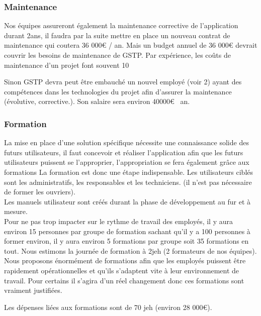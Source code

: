 \begin{enumerate}
    \subsubsection{Maintenance}

    Nos équipes assureront également la maintenance corrective de l'application durant 2ans, il faudra par la suite mettre en place un nouveau contrat de maintenance qui coutera 36 000€ / an. Mais un budget annuel de 36 000€ devrait couvrir les besoins de maintenance de GSTP. Par expérience, les coûts de maintenance d'un projet font souvent 10%

    Sinon GSTP devra peut être embauché un nouvel employé (voir 2) ayant des compétences dans les technologies du projet afin d'assurer la maintenance (évolutive, corrective.). Son salaire sera environ 40000€ \ an.\\

    \subsubsection{Formation}
        La mise en place d'une solution spécifique nécessite une connaissance solide des futurs utilisateurs, il faut concevoir et réaliser l'application afin que les futurs utilisateurs puissent se l'approprier, l'appropriation se fera également grâce aux formations
          La formation est donc une étape indispensable. Les utilisateurs ciblés sont les administratifs, les responsables et les techniciens. (il n'est pas nécessaire de former les ouvriers).\\

    Les manuels utilisateur sont créés durant la phase de développement au fur et à mesure.\\

    Pour ne pas trop impacter sur le rythme de travail des employés, il y aura environ 15 personnes par groupe de formation sachant qu'il y a 100 personnes à former  environ, il y aura environ 5 formations par groupe soit 35 formations en tout.
    Nous estimons la journée de formation à 2jeh (2 formateurs de nos équipes). Nous proposons énormément de formations afin que les employés puissent être rapidement opérationnelles et qu'ils s'adaptent vite à leur environnement de travail. Pour certains il s'agira d'un réel changement donc ces formations sont vraiment justifiées.

    Les dépenses liées aux formations sont de 70 jeh (environ 28 000€).
     

    \end{enumerate}

